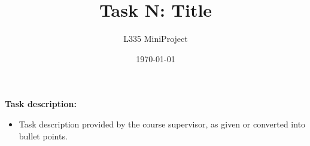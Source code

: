 \documentclass[11pt,a4paper]{article}
\title{Task N: Title}
\author{L335 MiniProject}
\date{\today}
\makeatletter
\renewcommand{\maketitle}{%
  \noindent{\LARGE \@title\par}\vspace{0.6em}
  \noindent{\large \@author\hfill\@date\par}\vspace{3em}}
\makeatother
\begin{document}
\maketitle

\noindent\textbf{Task description:}
\begin{itemize}[label=--, leftmargin=2.5em, rightmargin=2.5em, labelindent=1em, labelwidth=1em, labelsep=0.5em, align=left, topsep=0pt, partopsep=0pt, itemsep=0pt, parsep=0pt]
\item Task description provided by the course supervisor, as given or converted into bullet points.
\end{itemize}
\vspace{1.3em}%
\end{document}
